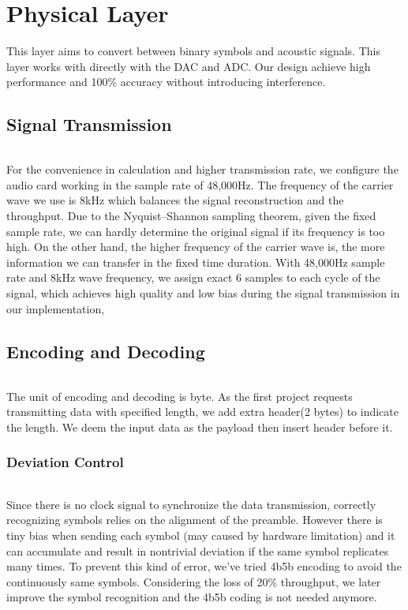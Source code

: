 \chapter{Physical Layer}\label{ch:ch2label}

This layer aims to convert between binary symbols and acoustic signals. This layer works with directly with the DAC and ADC. Our design achieve high performance and 100\% accuracy without introducing interference.

\section{Signal Transmission}
\subparagraph{}
For the convenience in calculation and higher transmission rate, we configure the audio card working in the sample rate of 48,000Hz. The frequency of the carrier wave we use is 8kHz which balances the signal reconstruction and the throughput. Due to the Nyquist–Shannon sampling theorem, given the fixed sample rate, we can hardly determine the original signal if its frequency is too high. On the other hand, the higher frequency of the carrier wave is, the more information we can transfer in the fixed time duration. With 48,000Hz sample rate and 8kHz wave frequency, we assign exact 6 samples to each cycle of the signal, which achieves high quality and low bias during the signal transmission in our implementation, 

\section{Encoding and Decoding}
\subparagraph{}
The unit of encoding and decoding is byte. As the first project requests transmitting data with specified length, we add extra header(2 bytes) to indicate the length. We deem the input data as the payload then insert header before it.
\subsection{Deviation Control}
\subparagraph{}
Since there is no clock signal to synchronize the data transmission, correctly recognizing symbols relies on the alignment of the preamble. However there is tiny bias when sending each symbol (may caused by hardware limitation) and it can accumulate and result in nontrivial deviation if the same symbol replicates many times. To prevent this kind of error, we've tried 4b5b encoding to avoid the continuously same symbols. Considering the loss of 20\% throughput, we later improve the symbol recognition and the 4b5b coding is not needed anymore.
